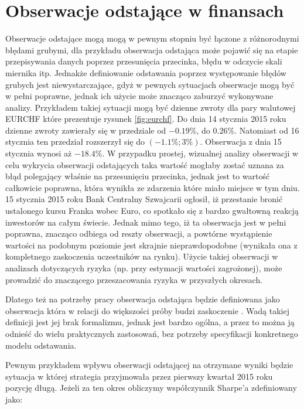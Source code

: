\documentclass[a4paper,12pt,openany, DIV=calc, headsepline]{scrbook}
\begin{document}
\section{Obserwacje odstające w finansach}

Obserwacje odstające mogą mogą w pewnym stopniu być łączone z różnorodnymi błędami grubymi, dla przykładu obserwacja odstająca może pojawić się na etapie przepisywania danych poprzez przesunięcia przecinka, błędu w odczycie skali miernika itp. Jednakże definiowanie odstawania poprzez występowanie błędów grubych jest niewystarczające, gdyż w pewnych sytuacjach obserwacje mogą być w pełni poprawne, jednak ich użycie może znacząco zaburzyć wykonywane analizy. Przykładem takiej sytuacji mogą być dzienne zwroty dla pary walutowej EURCHF które prezentuje rysunek \ref{fig:eurchf}. Do dnia 14 stycznia 2015 roku dzienne zwroty zawierały się w przedziale od $-0.19\%$, do $0.26\%$. Natomiast od 16 stycznia ten przedział rozszerzył się do $(-1.1 \%; 3\%)$. Obserwacja z dnia 15 stycznia wynosi aż $-18.4\%$. W przypadku prostej, wizualnej analizy obserwacji w celu wykrycia obserwacji odstających taka wartość mogłaby zostać uznana za błąd polegający właśnie na przesunięciu przecinka, jednak jest to wartość całkowicie poprawna, która wynikła ze zdarzenia które miało miejsce w tym dniu. 15 stycznia 2015 roku Bank Centralny Szwajcarii ogłosił, iż przestanie bronić ustalonego kursu Franka wobec Euro, co spotkało się z bardzo gwałtowną reakcją inwestorów na całym świecie. Jednak mimo tego, iż ta obserwacja jest w pełni poprawna, znacząco odbiega od reszty obserwacji, a powtórne wystąpienie wartości na podobnym poziomie jest skrajnie nieprawdopodobne (wynikała ona z kompletnego zaskoczenia uczestników na rynku). Użycie takiej obserwacji w analizach dotyczących ryzyka (np. przy estymacji wartości zagrożonej), może prowadzić do znaczącego przeszacowania ryzyka w przyszłych okresach.

Dlatego też na potrzeby pracy obserwacja odstająca będzie definiowana jako obserwacja która w relacji do większości próby budzi zaskoczenie \citep{Ripley2004}. Wadą takiej definicji jest jej brak formalizmu, jednak jest bardzo ogólna, a przez to można ją odnieść do wielu praktycznych zastosowań, bez potrzeby specyfikacji konkretnego modelu odstawania.

Pewnym przykładem wpływu obserwacji odstającej na otrzymane wyniki będzie sytuacja w której strategia przyjmowała przez pierwszy kwartał 2015 roku pozycję długą. Jeżeli za ten okres obliczymy współczynnik Sharpe'a zdefiniowany jako:
\end{document}
